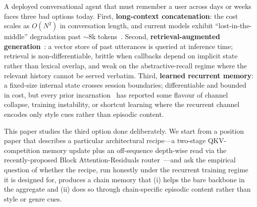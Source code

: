 \documentclass{article}
\begin{document}
A deployed conversational agent that must remember a user across
days or weeks faces three bad options today.
First, \textbf{long-context concatenation}: the cost scales as
$O(N^2)$ in conversation length, and current models exhibit
``lost-in-the-middle'' degradation past $\sim$8k
tokens~\cite{liu2024lostmiddle}.
Second, \textbf{retrieval-augmented generation}~\cite{lewis2020retrieval}:
a vector store of past utterances is queried at inference time;
retrieval is non-differentiable, brittle when callbacks depend on
implicit state rather than lexical overlap, and weak on the
abstractive-recall regime where the relevant history cannot be served
verbatim.
Third, \textbf{learned recurrent memory}: a fixed-size internal state
crosses session boundaries; differentiable and bounded in cost, but
every prior incarnation~\cite{daiTransformerXL2019,
rae2019compressive, bulatov2022rmt, hutchins2022blockrecurrent,
wu2022memorising} has reported some flavour of channel collapse,
training instability, or shortcut learning where the recurrent
channel encodes only style cues rather than episodic content.

This paper studies the third option done deliberately. We start from
a position paper \cite{liu2025memres} that describes a particular
architectural recipe---a two-stage QKV-competition memory update plus
an off-sequence depth-wise read via the recently-proposed Block
Attention-Residuals router~\cite{du2025blockattnres}---and ask the
empirical question of whether the recipe, run honestly under the
recurrent training regime it is designed for, produces a chain memory
that (i) helps the bare backbone in the aggregate and (ii) does so
through chain-specific episodic content rather than style or genre cues.
\end{document}
